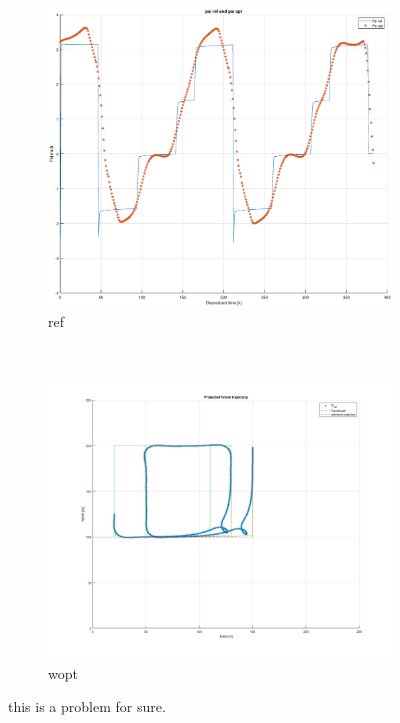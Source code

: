 \begin{figure}[b] %
    \centering
    \begin{subfigure}{0.90\textwidth}
        \includegraphics[width=\textwidth]{Images/Figures/Extra_Stuff/WrapTo2Pi_problem_Ref}
        \caption{ref}
    \end{subfigure}
    \hfill
    \\
    \begin{subfigure}{0.90\textwidth}
        \includegraphics[width=\textwidth]{Images/Figures/Extra_Stuff/WrapTo2Pi_problem_Wopt}
        \caption{wopt}
    \end{subfigure}
    \caption{this is a problem for sure.}
\end{figure}


